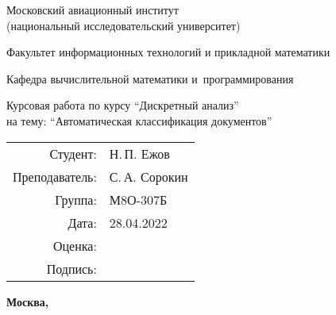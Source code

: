 \begin{titlepage}
\begin{center}
\bfseries

{\Large Московский авиационный институт\\ (национальный исследовательский университет)

}

\vspace{48pt}

{\large Факультет информационных технологий и прикладной математики
}

\vspace{36pt}

{\large Кафедра вычислительной математики и~программирования

}


\vspace{48pt}

Курсовая работа по курсу \enquote{Дискретный анализ} 
\\ на тему: \enquote{Автоматическая классификация документов}

\end{center}

\vspace{72pt}

\begin{flushright}
\begin{tabular}{rl}
Студент: & Н.\,П. Ежов \\
Преподаватель: & С.\,А. Сорокин\\
Группа: & М8О-307Б \\
Дата: & 28.04.2022\\
Оценка: & \\
Подпись: & \\
\end{tabular}
\end{flushright}

\vfill

\begin{center}
\bfseries
Москва, \the\year
\end{center}
\end{titlepage}

\pagebreak
